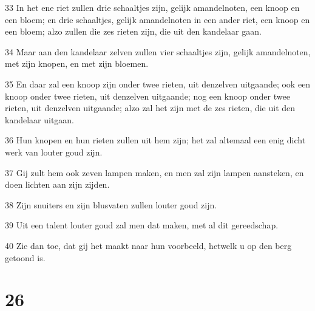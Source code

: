 \par 33 In het ene riet zullen drie schaaltjes zijn, gelijk amandelnoten, een knoop en een bloem; en drie schaaltjes, gelijk amandelnoten in een ander riet, een knoop en een bloem; alzo zullen die zes rieten zijn, die uit den kandelaar gaan.
\par 34 Maar aan den kandelaar zelven zullen vier schaaltjes zijn, gelijk amandelnoten, met zijn knopen, en met zijn bloemen.
\par 35 En daar zal een knoop zijn onder twee rieten, uit denzelven uitgaande; ook een knoop onder twee rieten, uit denzelven uitgaande; nog een knoop onder twee rieten, uit denzelven uitgaande; alzo zal het zijn met de zes rieten, die uit den kandelaar uitgaan.
\par 36 Hun knopen en hun rieten zullen uit hem zijn; het zal altemaal een enig dicht werk van louter goud zijn.
\par 37 Gij zult hem ook zeven lampen maken, en men zal zijn lampen aansteken, en doen lichten aan zijn zijden.
\par 38 Zijn snuiters en zijn blusvaten zullen louter goud zijn.
\par 39 Uit een talent louter goud zal men dat maken, met al dit gereedschap.
\par 40 Zie dan toe, dat gij het maakt naar hun voorbeeld, hetwelk u op den berg getoond is.

\chapter{26}

